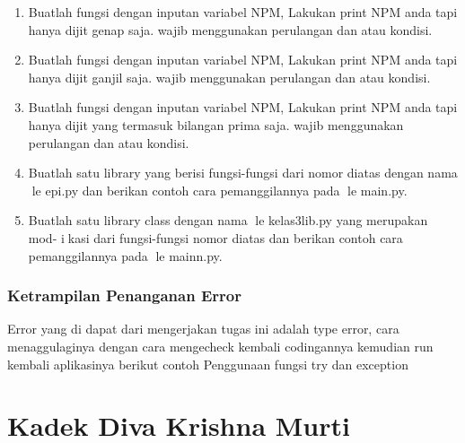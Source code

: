 \begin{enumerate}
    \item Buatlah fungsi dengan inputan variabel NPM, Lakukan print NPM anda tapi
    hanya dijit genap saja. wajib menggunakan perulangan dan atau kondisi.
    

    \item Buatlah fungsi dengan inputan variabel NPM, Lakukan print NPM anda tapi
    hanya dijit ganjil saja. wajib menggunakan perulangan dan atau kondisi.
    

    \item Buatlah fungsi dengan inputan variabel NPM, Lakukan print NPM anda tapi
    hanya dijit yang termasuk bilangan prima saja. wajib menggunakan perulangan
    dan atau kondisi.
    

    \item Buatlah satu library yang berisi fungsi-fungsi dari nomor diatas dengan nama
    le epi.py dan berikan contoh cara pemanggilannya pada le main.py.
    

    \item Buatlah satu library class dengan nama le kelas3lib.py yang merupakan mod-
    ikasi dari fungsi-fungsi nomor diatas dan berikan contoh cara pemanggilannya
    pada le mainn.py.
    
    
\end{enumerate}
\subsubsection{Ketrampilan Penanganan Error}
Error yang di dapat dari mengerjakan tugas ini adalah type error, cara menaggulaginya dengan cara mengecheck kembali codingannya
kemudian run kembali aplikasinya
berikut contoh Penggunaan fungsi try dan exception


\section{Kadek Diva Krishna Murti}
